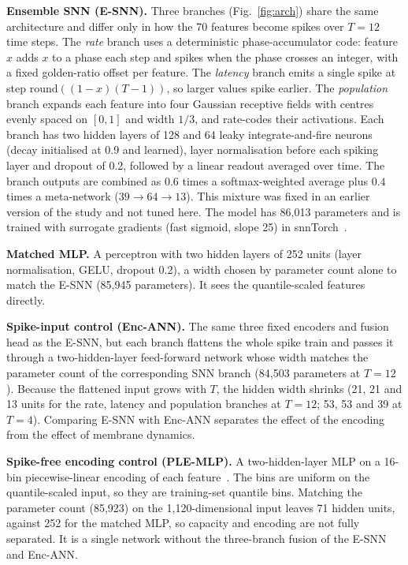 \documentclass[conference]{IEEEtran}
\begin{document}
\textbf{Ensemble SNN (E-SNN).} Three branches (Fig.~\ref{fig:arch}) share the same architecture and differ only in how the 70 features become spikes over $T = 12$ time steps. The \emph{rate} branch uses a deterministic phase-accumulator code: feature $x$ adds $x$ to a phase each step and spikes when the phase crosses an integer, with a fixed golden-ratio offset per feature. The \emph{latency} branch emits a single spike at step $\mathrm{round}((1-x)(T-1))$, so larger values spike earlier. The \emph{population} branch expands each feature into four Gaussian receptive fields with centres evenly spaced on $[0,1]$ and width $1/3$, and rate-codes their activations. Each branch has two hidden layers of 128 and 64 leaky integrate-and-fire neurons (decay initialised at 0.9 and learned), layer normalisation before each spiking layer and dropout of 0.2, followed by a linear readout averaged over time. The branch outputs are combined as $0.6$ times a softmax-weighted average plus $0.4$ times a meta-network ($39 \to 64 \to 13$). This mixture was fixed in an earlier version of the study and not tuned here. The model has 86{,}013 parameters and is trained with surrogate gradients (fast sigmoid, slope 25) in snnTorch~\cite{eshraghian2023}.

\textbf{Matched MLP.} A perceptron with two hidden layers of 252 units (layer normalisation, GELU, dropout 0.2), a width chosen by parameter count alone to match the E-SNN (85{,}945 parameters). It sees the quantile-scaled features directly.

\textbf{Spike-input control (Enc-ANN).} The same three fixed encoders and fusion head as the E-SNN, but each branch flattens the whole spike train and passes it through a two-hidden-layer feed-forward network whose width matches the parameter count of the corresponding SNN branch (84{,}503 parameters at $T = 12$). Because the flattened input grows with $T$, the hidden width shrinks (21, 21 and 13 units for the rate, latency and population branches at $T = 12$; 53, 53 and 39 at $T = 4$). Comparing E-SNN with Enc-ANN separates the effect of the encoding from the effect of membrane dynamics.

\textbf{Spike-free encoding control (PLE-MLP).} A two-hidden-layer MLP on a 16-bin piecewise-linear encoding of each feature~\cite{gorishniy2022}. The bins are uniform on the quantile-scaled input, so they are training-set quantile bins. Matching the parameter count (85{,}923) on the 1{,}120-dimensional input leaves 71 hidden units, against 252 for the matched MLP, so capacity and encoding are not fully separated. It is a single network without the three-branch fusion of the E-SNN and Enc-ANN.
\end{document}
